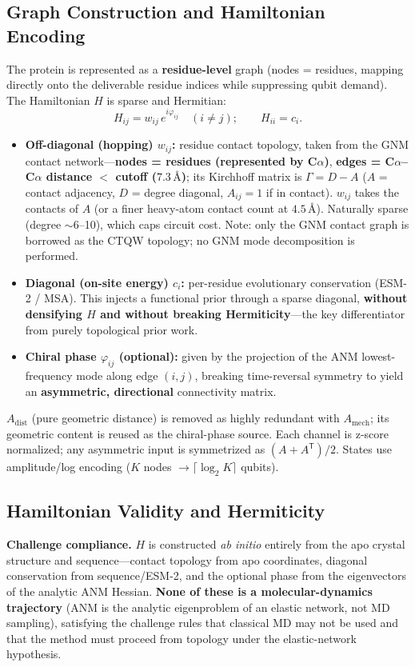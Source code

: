 \documentclass[11pt,a4paper]{article}
\newcommand{\lead}[1]{\textbf{#1}}
\newcommand{\note}[1]{{\color{grey}\small #1}}
\newcommand{\Ang}{\text{\AA}}
\begin{document}
\subsection{Graph Construction and Hamiltonian Encoding}
The protein is represented as a \lead{residue-level} graph (nodes = residues, mapping directly onto the deliverable residue indices while suppressing qubit demand). The Hamiltonian $H$ is sparse and Hermitian:
\begin{equation*}
H_{ij}=w_{ij}\,e^{i\varphi_{ij}}\quad(i\neq j);\qquad H_{ii}=c_i .
\end{equation*}
\begin{itemize}
\item \lead{Off-diagonal (hopping) $w_{ij}$:} residue contact topology, taken from the GNM contact network---\lead{nodes = residues (represented by C$\alpha$)}, \lead{edges = C$\alpha$--C$\alpha$ distance $<$ cutoff ($7.3\,\Ang$)}; its Kirchhoff matrix is $\Gamma = D - A$ ($A$ = contact adjacency, $D$ = degree diagonal, $A_{ij}=1$ if in contact). $w_{ij}$ takes the contacts of $A$ (or a finer heavy-atom contact count at $4.5\,\Ang$). Naturally sparse (degree $\sim$6--10), which caps circuit cost. \note{Note: only the GNM contact graph is borrowed as the CTQW topology; no GNM mode decomposition is performed.}
\item \lead{Diagonal (on-site energy) $c_i$:} per-residue evolutionary conservation (ESM-2 / MSA). This injects a functional prior through a sparse diagonal, \lead{without densifying $H$ and without breaking Hermiticity}---the key differentiator from purely topological prior work.
\item \lead{Chiral phase $\varphi_{ij}$ (optional):} given by the projection of the ANM lowest-frequency mode along edge $(i,j)$, breaking time-reversal symmetry to yield an \lead{asymmetric, directional} connectivity matrix.
\end{itemize}
\note{$A_{\text{dist}}$ (pure geometric distance) is removed as highly redundant with $A_{\text{mech}}$; its geometric content is reused as the chiral-phase source. Each channel is z-score normalized; any asymmetric input is symmetrized as $(A+A^{\mathsf T})/2$. States use amplitude/log encoding ($K$ nodes $\rightarrow \lceil\log_2 K\rceil$ qubits).}

\subsection{Hamiltonian Validity and Hermiticity}
\lead{Challenge compliance.} $H$ is constructed \emph{ab initio} entirely from the apo crystal structure and sequence---contact topology from apo coordinates, diagonal conservation from sequence/ESM-2, and the optional phase from the eigenvectors of the analytic ANM Hessian. \lead{None of these is a molecular-dynamics trajectory} (ANM is the analytic eigenproblem of an elastic network, not MD sampling), satisfying the challenge rules that classical MD may not be used and that the method must proceed from topology under the elastic-network hypothesis.
\end{document}

